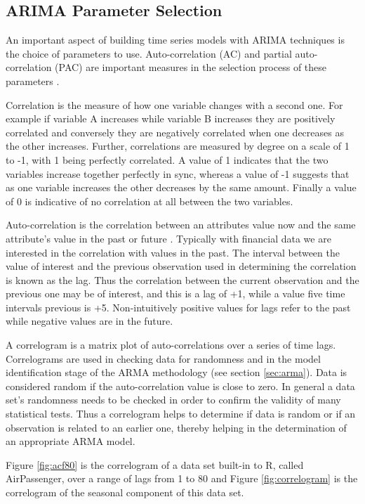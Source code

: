 \subsection{ARIMA Parameter Selection}
An important aspect of building time series models with ARIMA techniques is the choice of parameters to use. Auto-correlation (AC) and partial auto-correlation (PAC) are important measures in the selection process of these parameters \citep{mills2011}. 

Correlation is the measure of how one variable changes with a second one. For example if variable A increases while variable B increases they are positively correlated and conversely they are negatively correlated when one decreases as the other increases. Further, correlations are measured by degree on a scale of 1 to -1, with 1 being perfectly correlated. A value of 1 indicates that the two variables increase together perfectly in sync, whereas a value of -1 suggests that as one variable increases the other decreases by the same amount. Finally a value of 0 is indicative of no correlation at all between the two variables.

Auto-correlation is the correlation between an attributes value now and the same attribute's value in the past or future \citep{shumway2010time}. Typically with financial data we are interested in the correlation with values in the past. The interval between the value of interest and the previous observation used in determining the correlation is known as the lag. Thus the correlation between the current observation and the previous one may be of interest, and this is a lag of +1, while a value five time intervals previous is +5. Non-intuitively positive values for lags refer to the past while negative values are in the future. 

A correlogram is a matrix plot of auto-correlations over a series of time lags.  Correlograms are used in checking data for randomness and in the model identification stage of the ARMA methodology (see section \ref{sec:arma}). Data is considered random if the auto-correlation value is close to zero.  In general a data set's randomness needs to be checked in order to confirm the validity of many statistical tests. Thus a correlogram helps to determine if data is random or if an observation is related to an earlier one, thereby helping in the determination of an appropriate ARMA model. 

Figure \ref{fig:acf80} is the correlogram of a data set built-in to R, called AirPassenger, over a range of lags from 1 to 80 and Figure \ref{fig:correlogram} is the correlogram of the seasonal component of this data set.

